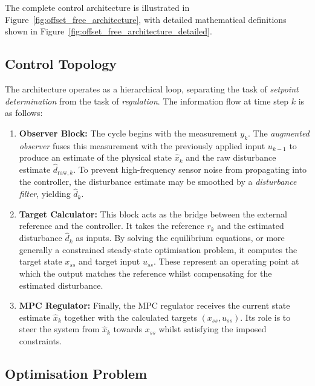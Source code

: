 The complete control architecture is illustrated in Figure~\ref{fig:offset_free_architecture}, with detailed mathematical definitions shown in Figure~\ref{fig:offset_free_architecture_detailed}.

\subsection{Control Topology}

The architecture operates as a hierarchical loop, separating the task of \emph{setpoint determination} from the task of \emph{regulation}. The information flow at time step \(k\) is as follows:

\begin{enumerate}
	\item \textbf{Observer Block:} The cycle begins with the measurement \(y_k\). The \emph{augmented observer} fuses this measurement with the previously applied input \(u_{k-1}\) to produce an estimate of the physical state \(\hat x_k\) and the raw disturbance estimate \(\hat d_{\mathrm{raw},k}\). To prevent high-frequency sensor noise from propagating into the controller, the disturbance estimate may be smoothed by a \emph{disturbance filter}, yielding \(\hat d_k\).
	
	\item \textbf{Target Calculator:} This block acts as the bridge between the external reference and the controller. It takes the reference \(r_k\) and the estimated disturbance \(\hat d_k\) as inputs. By solving the equilibrium equations, or more generally a constrained steady-state optimisation problem, it computes the target state \(x_{ss}\) and target input \(u_{ss}\). These represent an operating point at which the output matches the reference whilst compensating for the estimated disturbance.
	
	\item \textbf{MPC Regulator:} Finally, the MPC regulator receives the current state estimate \(\hat x_k\) together with the calculated targets \((x_{ss},u_{ss})\). Its role is to steer the system from \(\hat x_k\) towards \(x_{ss}\) whilst satisfying the imposed constraints.
\end{enumerate}

\subsection{Optimisation Problem}

